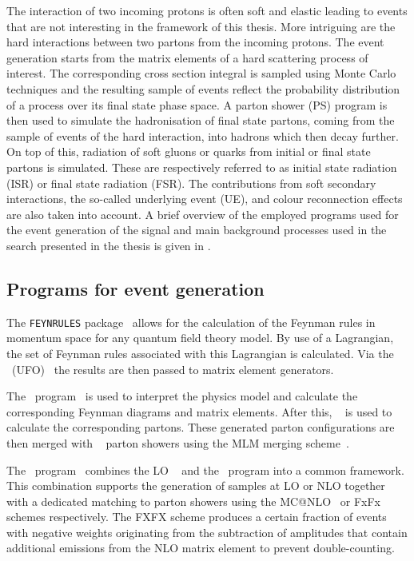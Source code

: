 The interaction of two incoming protons is often soft and elastic leading to events that are not interesting in the framework of this thesis. More intriguing are the hard interactions between two partons from the incoming protons. The event generation starts from the matrix elements of a hard scattering process of interest. The corresponding cross section integral is sampled using Monte Carlo techniques and the resulting sample of events reflect the probability distribution of a process over its final state phase space. A parton shower (PS) program is then used to simulate the hadronisation of final state partons,  coming from the sample of events of the hard interaction, into hadrons which then decay further. On top of this,  radiation of soft gluons or quarks from initial or final state partons is simulated. These are respectively referred to as initial state radiation (ISR) or final state radiation (FSR). The contributions from soft secondary interactions, the so-called underlying event (UE), and colour reconnection effects are also taken into account. 
A brief overview of the employed programs used for the event generation of the signal and main background processes used in the search presented in the thesis is given in .

\subsection{Programs for event generation}
\label{sec:programs}
The \texttt{FEYNRULES} package~\cite{Alloul:2013bka} allows for the calculation of  the Feynman rules in momentum space for any quantum field theory model. By use of a Lagrangian, the set of Feynman rules associated with this Lagrangian is calculated. Via the \UFO\ (UFO)~\cite{Degrande:2011ua} the results are then passed to matrix element generators. 


The \MG\  program~\cite{Alwall:2011uj} is used to interpret the physics model and calculate the corresponding Feynman diagrams and matrix elements. After this, \ME~\cite{Mangano:2006rw} is used to calculate the corresponding partons. These generated parton configurations are then merged with \Pythia~\cite{Sjostrand2015159,Sjostrand:2006za,Sjostrand:2014zea} parton showers using the MLM merging scheme~\cite{Alwall:2007fs}. 

The \aMCMG\ program~\cite{Alwall:2014hca} combines the LO \MG~\cite{Alwall:2011uj} and the \aMC\ program into a common framework. This combination supports the generation of samples at LO or NLO together with a dedicated matching to parton showers  using the MC@NLO~\cite{Frixione:2002ik} or FxFx~\cite{Frederix:2012ps} schemes respectively. The FXFX scheme produces a certain fraction of events with negative weights originating from the subtraction of amplitudes that contain additional emissions from the NLO matrix element to prevent double-counting.



